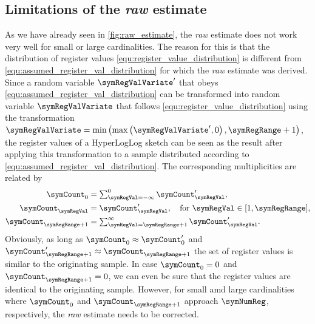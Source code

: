 \documentclass[a4paper]{scrartcl}
\begin{document}
\subsection{Limitations of the \emph{raw} estimate}
As we have already seen in \autoref{fig:raw_estimate}, the \emph{raw} estimate does not work very well for small or large cardinalities. The reason for this is that the distribution of register values \eqref{equ:register_value_distribution} is different from \eqref{equ:assumed_register_val_distribution} for which the \emph{raw} estimate was derived. Since a random variable $\symRegValVariate'$ that obeys \eqref{equ:assumed_register_val_distribution} can be transformed into random variable $\symRegValVariate$ that follows \eqref{equ:register_value_distribution} using the transformation $\symRegValVariate = \min\left(\max\left(\symRegValVariate', 0\right), \symRegRange+1\right)$, the register values of a HyperLogLog sketch can be seen as the result after applying this transformation to a sample distributed according to \eqref{equ:assumed_register_val_distribution}. The corresponding multiplicities are related by
\begin{equation}
\label{equ:multiplicity_transformation}
\begin{aligned}
\symCount_0 &= \textstyle\sum_{\symRegVal = -\infty}^{0} \symCount'_\symRegVal, \\
\symCount_\symRegVal &=  \symCount'_\symRegVal, \quad \text{for $\symRegVal \in [1, \symRegRange]$},\\
\symCount_{\symRegRange+1} &= \textstyle\sum_{\symRegVal = \symRegRange + 1}^{\infty} \symCount'_\symRegVal.
\end{aligned}
\end{equation}
Obviously, as long as $\symCount_0\approx\symCount'_0$ and  $\symCount'_{\symRegRange+1}\approx\symCount_{\symRegRange+1}$ the set of register values is similar to the originating sample. In case $\symCount_0=0$ and $\symCount_{\symRegRange+1}=0$, we can even be sure that the register values are identical to the originating sample. However, for small amd large cardinalities where $\symCount_0$ and $\symCount_{\symRegRange+1}$ approach $\symNumReg$, respectively, the \emph{raw} estimate needs to be corrected.
\end{document}
